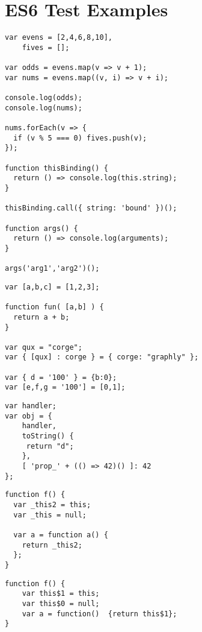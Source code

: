 
\chapter{ES6 Test Examples} %

\label{AppendixC} %


\begin{lstlisting}[caption=Arrow function]
var evens = [2,4,6,8,10],
    fives = [];

var odds = evens.map(v => v + 1);
var nums = evens.map((v, i) => v + i);

console.log(odds);
console.log(nums);

nums.forEach(v => {
  if (v % 5 === 0) fives.push(v);
});

function thisBinding() {
  return () => console.log(this.string);
}

thisBinding.call({ string: 'bound' })();

function args() {
  return () => console.log(arguments);
}

args('arg1','arg2')();
\end{lstlisting}

\begin{lstlisting}[caption=Destructuring]
var [a,b,c] = [1,2,3];

function fun( [a,b] ) {
  return a + b;
}

var qux = "corge";
var { [qux] : corge } = { corge: "graphly" };

var { d = '100' } = {b:0};
var [e,f,g = '100'] = [0,1];
\end{lstlisting}

\begin{lstlisting}[caption=Object literals]
var handler;
var obj = {
    handler,
    toString() {
     return "d";
    },
    [ 'prop_' + (() => 42)() ]: 42
};
\end{lstlisting}

\begin{lstlisting}[caption=Babel JS]
function f() {
  var _this2 = this;
  var _this = null;

  var a = function a() {
    return _this2;
  };
}
\end{lstlisting}

\begin{lstlisting}[caption=ES6 Transpiler]
function f() {
	var this$1 = this;
  	var this$0 = null;
  	var a = function()  {return this$1};
}
\end{lstlisting}
